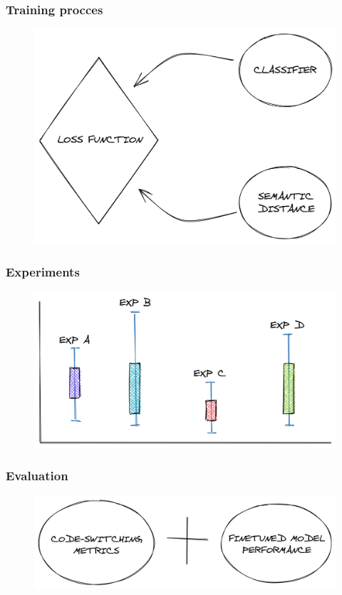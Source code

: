\documentclass{beamer}
\begin{document}
\begin{frame}
\frametitle{Training procces}
\begin{figure}
	\includegraphics[width=0.9\linewidth]{images/5.png}
\end{figure}
\end{frame}


\begin{frame}
\frametitle{Experiments}
\begin{figure}
	\includegraphics[width=0.9\linewidth]{images/2.png}
\end{figure}
\end{frame}


\begin{frame}
\frametitle{Evaluation}
\begin{figure}
	\includegraphics[width=0.9\linewidth]{images/6.png}
\end{figure}
\end{frame}
\end{document}
